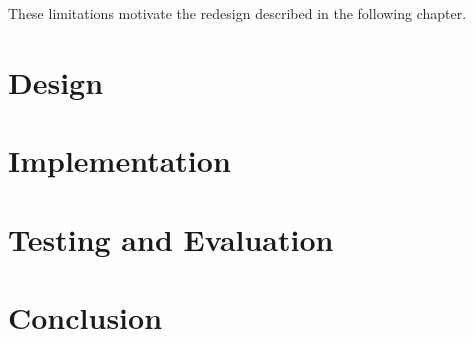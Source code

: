 These limitations motivate the redesign described in the following chapter.

\chapter{Design}
\label{chap:design}


\chapter{Implementation}
\label{chap:implementation}


\chapter{Testing and Evaluation}
\label{chap:testing}


\chapter{Conclusion}
\label{chap:conclusion}

